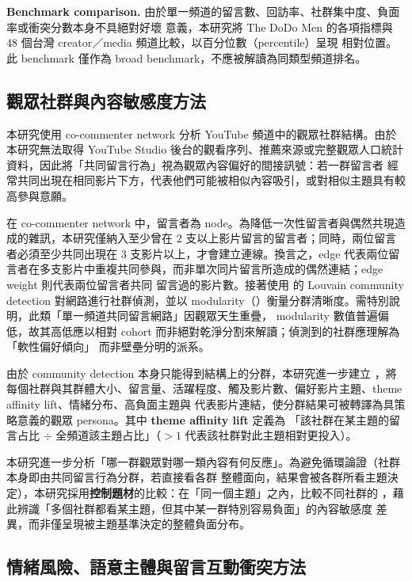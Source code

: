 \textbf{Benchmark comparison.} 由於單一頻道的留言數、回訪率、社群集中度、負面率或衝突分數本身不具絕對好壞
意義，本研究將 The DoDo Men 的各項指標與 48 個台灣 creator／media 頻道比較，以百分位數（percentile）呈現
相對位置。此 benchmark 僅作為 broad benchmark，不應被解讀為同類型頻道排名。

\subsection{觀眾社群與內容敏感度方法}
\label{sec:method-community}

本研究使用 co-commenter network 分析 YouTube 頻道中的觀眾社群結構。由於本研究無法取得 YouTube Studio
後台的觀看序列、推薦來源或完整觀眾人口統計資料，因此將「共同留言行為」視為觀眾內容偏好的間接訊號：若一群留言者
經常共同出現在相同影片下方，代表他們可能被相似內容吸引，或對相似主題具有較高參與意願。

在 co-commenter network 中，留言者為 node。為降低一次性留言者與偶然共現造成的雜訊，本研究僅納入至少曾在
$2$ 支以上影片留言的留言者；同時，兩位留言者必須至少共同出現在 $3$ 支影片以上，才會建立連線。換言之，edge
代表兩位留言者在多支影片中重複共同參與，而非單次同片留言所造成的偶然連結；edge weight 則代表兩位留言者共同
留言過的影片數。接著使用 \citet{blondel2008} 的 Louvain community detection 對網路進行社群偵測，並以
modularity（\citealp{newman2006}）衡量分群清晰度。需特別說明，此類「單一頻道共同留言網路」因觀眾天生重疊，
modularity 數值普遍偏低，故其高低應以相對 cohort 而非絕對乾淨分割來解讀；偵測到的社群應理解為「軟性偏好傾向」
而非壁壘分明的派系。

由於 community detection 本身只能得到結構上的分群，本研究進一步建立 ，將
每個社群與其群體大小、留言量、活躍程度、觸及影片數、偏好影片主題、theme affinity lift、情緒分布、高負面主題與
代表影片連結，使分群結果可被轉譯為具策略意義的觀眾 persona。其中 \textbf{theme affinity lift} 定義為
「該社群在某主題的留言占比 $\div$ 全頻道該主題占比」（$>1$ 代表該社群對此主題相對更投入）。

本研究進一步分析「哪一群觀眾對哪一類內容有何反應」。為避免循環論證（社群本身即由共同留言行為分群，若直接看各群
整體面向，結果會被各群所看主題決定），本研究採用\textbf{控制題材}的比較：在「同一個主題」之內，比較不同社群的
，藉此辨識「多個社群都看某主題，但其中某一群特別容易負面」的內容敏感度
差異，而非僅呈現被主題基準決定的整體負面分布。

\subsection{情緒風險、語意主體與留言互動衝突方法}
\label{sec:method-risk}


